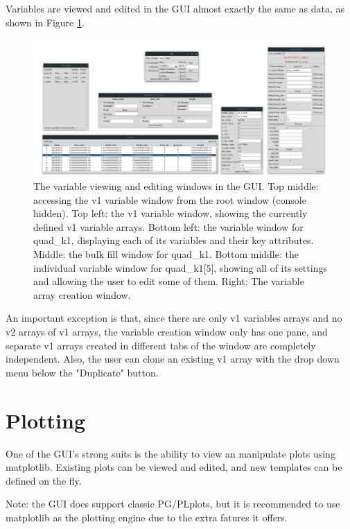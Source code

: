 Variables are viewed and edited in the GUI almost exactly the same as data, as shown in Figure \ref{fig:gui.variables}.
\begin{figure}
\centering
\includegraphics[width=12cm]{figures/variables.png}
\caption{The variable viewing and editing windows in the GUI.
Top middle: accessing the v1 variable window from the root window (console hidden).
Top left: the v1 variable window, showing the currently defined v1 variable arrays.
Bottom left: the variable window for quad_k1, displaying each of its variables and their key attributes.
Middle: the bulk fill window for quad_k1.
Bottom middle: the individual variable window for quad_k1[5], showing all of its settings and allowing the user to edit some of them.
Right: The variable array creation window.}
\label{fig:gui.variables}
\end{figure}
An important exception is that, since there are only v1 variables arrays and no v2 arrays of v1 arrays, the variable creation window only has one pane, and separate v1 arrays created in different tabs of the window are completely independent.
Also, the user can clone an existing v1 array with the drop down menu below the "Duplicate" button.

\section{Plotting}
\label{s:gui.plot}

One of the GUI's strong suits is the ability to view an manipulate plots using matplotlib.
Existing plots can be viewed and edited, and new templates can be defined on the fly.

Note: the GUI does support classic PG/PLplots, but it is recommended to use matplotlib as the plotting engine due to the extra fatures it offers.

